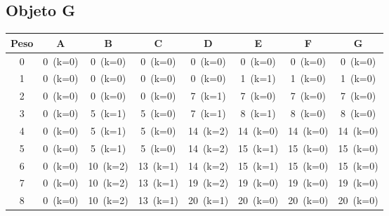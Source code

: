 \documentclass[12pt]{article}
\begin{document}
\begin{landscape}
\subsection*{Objeto G}
\begin{longtable}{cccccccc}
\toprule
Peso & A & B & C & D & E & F & G \\
\midrule
0 & \cellcolor{red!20}0~(k=0) & \cellcolor{red!20}0~(k=0) & \cellcolor{red!20}0~(k=0) & \cellcolor{red!20}0~(k=0) & \cellcolor{red!20}0~(k=0) & \cellcolor{red!20}0~(k=0) & \cellcolor{red!20}0~(k=0) \\
1 & \cellcolor{red!20}0~(k=0) & \cellcolor{red!20}0~(k=0) & \cellcolor{red!20}0~(k=0) & \cellcolor{red!20}0~(k=0) & \cellcolor{green!40}1~(k=1) & \cellcolor{red!20}1~(k=0) & \cellcolor{red!20}1~(k=0) \\
2 & \cellcolor{red!20}0~(k=0) & \cellcolor{red!20}0~(k=0) & \cellcolor{red!20}0~(k=0) & \cellcolor{green!40}7~(k=1) & \cellcolor{red!20}7~(k=0) & \cellcolor{red!20}7~(k=0) & \cellcolor{red!20}7~(k=0) \\
3 & \cellcolor{red!20}0~(k=0) & \cellcolor{green!40}5~(k=1) & \cellcolor{red!20}5~(k=0) & \cellcolor{green!40}7~(k=1) & \cellcolor{green!40}8~(k=1) & \cellcolor{red!20}8~(k=0) & \cellcolor{red!20}8~(k=0) \\
4 & \cellcolor{red!20}0~(k=0) & \cellcolor{green!40}5~(k=1) & \cellcolor{red!20}5~(k=0) & \cellcolor{green!40}14~(k=2) & \cellcolor{red!20}14~(k=0) & \cellcolor{red!20}14~(k=0) & \cellcolor{red!20}14~(k=0) \\
5 & \cellcolor{red!20}0~(k=0) & \cellcolor{green!40}5~(k=1) & \cellcolor{red!20}5~(k=0) & \cellcolor{green!40}14~(k=2) & \cellcolor{green!40}15~(k=1) & \cellcolor{red!20}15~(k=0) & \cellcolor{red!20}15~(k=0) \\
6 & \cellcolor{red!20}0~(k=0) & \cellcolor{green!40}10~(k=2) & \cellcolor{green!40}13~(k=1) & \cellcolor{green!40}14~(k=2) & \cellcolor{green!40}15~(k=1) & \cellcolor{red!20}15~(k=0) & \cellcolor{red!20}15~(k=0) \\
7 & \cellcolor{red!20}0~(k=0) & \cellcolor{green!40}10~(k=2) & \cellcolor{green!40}13~(k=1) & \cellcolor{green!40}19~(k=2) & \cellcolor{red!20}19~(k=0) & \cellcolor{red!20}19~(k=0) & \cellcolor{red!20}19~(k=0) \\
8 & \cellcolor{red!20}0~(k=0) & \cellcolor{green!40}10~(k=2) & \cellcolor{green!40}13~(k=1) & \cellcolor{green!40}20~(k=1) & \cellcolor{yellow!50}20~(k=0) & \cellcolor{red!20}20~(k=0) & \cellcolor{red!20}20~(k=0) \\

\end{longtable}
\end{landscape}
\end{document}

